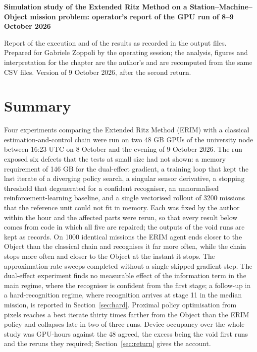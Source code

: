 \documentclass[11pt,a4paper]{article}
\begin{document}
\noindent\textbf{Simulation study of the Extended Ritz Method on a Station--Machine--Object mission problem: operator's report of the GPU run of 8--9 October 2026}

\noindent Report of the execution and of the results as recorded in the output files. Prepared for Gabriele Zoppoli by the operating session; the analysis, figures and interpretation for the chapter are the author's and are recomputed from the same CSV files. Version of 9 October 2026, after the second return.

\section*{Summary}

Four experiments comparing the Extended Ritz Method (ERIM) with a classical estimation-and-control chain were run on two 48 GB GPUs of the university node between 16:23 UTC on 8 October and the evening of 9 October 2026. The run exposed six defects that the tests at small size had not shown: a memory requirement of 146 GB for the dual-effect gradient, a training loop that kept the last iterate of a diverging policy search, a singular sensor derivative, a stopping threshold that degenerated for a confident recogniser, an unnormalised reinforcement-learning baseline, and a single vectorised rollout of 3200 missions that the reference unit could not fit in memory. Each was fixed by the author within the hour and the affected parts were rerun, so that every result below comes from code in which all five are repaired; the outputs of the void runs are kept as records. On 1000 identical missions the ERIM agent ends closer to the Object than the classical chain and recognises it far more often, while the chain stops more often and closer to the Object at the instant it stops. The approximation-rate sweeps completed without a single skipped gradient step. The dual-effect experiment finds no measurable effect of the information term in the main regime, where the recogniser is confident from the first stage; a follow-up in a hard-recognition regime, where recognition arrives at stage 11 in the median mission, is reported in Section~\ref{sec:hard}. Proximal policy optimisation from pixels reaches a best iterate thirty times farther from the Object than the ERIM policy and collapses late in two of three runs. Device occupancy over the whole study was  GPU-hours against the 48 agreed, the excess being the void first runs and the reruns they required; Section~\ref{sec:return} gives the account.
\end{document}
